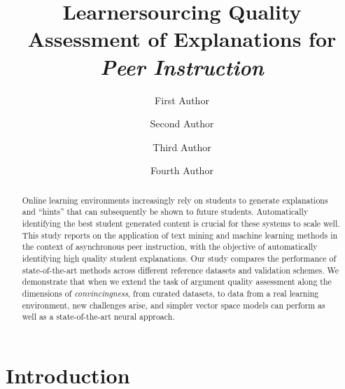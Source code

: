 \documentclass[runningheads]{llncs}
\begin{document}
%
\title{Learnersourcing Quality Assessment of Explanations for \textit{Peer 
Instruction}}
%
\author{First Author \and
	Second Author \and
	Third Author \and
	Fourth Author
}
%



%
\maketitle              %
%
\begin{abstract}
Online learning environments increasingly rely on students to generate 
explanations and ``hints'' that can subsequently be shown to future students. 
Automatically identifying the best student generated content is crucial for these systems to 
scale well. 
This study reports on the application of text mining and machine learning 
methods in the context of asynchronous peer instruction, with the objective of 
automatically identifying high quality student explanations. 
Our study compares the performance of state-of-the-art methods across different 
reference datasets and validation schemes.
We demonstrate that when we extend the task of argument quality assessment 
along the dimensions of \textit{convincingness}, from curated datasets, to data 
from a real learning environment, new challenges arise, and simpler vector 
space models can perform as well as a state-of-the-art neural approach. 

\end{abstract}


\section{Introduction}
\end{document}
